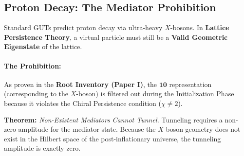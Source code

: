 \subsection{Proton Decay: The Mediator Prohibition}

Standard GUTs predict proton decay via ultra-heavy $X$-bosons. In \textbf{Lattice Persistence Theory}, a virtual particle must still be a \textbf{Valid Geometric Eigenstate} of the lattice.

\paragraph{The Prohibition:} As proven in the \textbf{Root Inventory (Paper I)}, the $\mathbf{10}$ representation (corresponding to the $X$-boson) is filtered out during the Initialization Phase because it violates the Chiral Persistence condition ($\chi \neq 2$).

\textbf{Theorem:} \textit{Non-Existent Mediators Cannot Tunnel.} Tunneling requires a non-zero amplitude for the mediator state. Because the $X$-boson geometry does not exist in the Hilbert space of the post-inflationary universe, the tunneling amplitude is exactly zero.